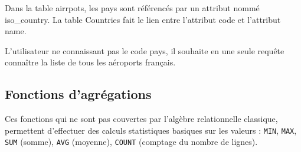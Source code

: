 \documentclass[10pt]{article}
\newif\ifprofvar
\begin{document}
\begin{exemple}
Dans la table airrpots, les pays sont référencés par un attribut nommé iso\_country. La table Countries fait le lien entre l'attribut code et l'attribut name. 

L'utilisateur ne connaissant pas le code pays, il souhaite en une seule requête connaître la liste de tous les aéroports français. 
\ifprofvar
$$
\pi_{\text{name}}\left( 
\pi_{\text{name,code}}\left(\text{Countries}  \right)
\underset{\text{airports.iso\_country}=\text{Countries.code}}{\bowtie }
\pi_{\text{name,iso\_country}}\left( \text{airports}  \right)
\right)
$$

\begin{envsql}
\begin{sql}
SELECT name FROM 
    (SELECT name, iso_country FROM airports) AS aeroports
    INNER JOIN 
    (SELECT Countries.code from Countries WHERE name="France") AS pays     
        ON aeroports.iso_country=pays.code
\end{sql}
\end{envsql}
\else
\vspace{6cm}
\fi


\end{exemple}

\subsection{Fonctions d'agrégations}
\begin{defi}
Ces fonctions qui ne sont pas couvertes par l’algèbre relationnelle 
classique, permettent d’effectuer des calculs statistiques basiques sur les valeurs : \texttt{MIN}, \texttt{MAX}, \texttt{SUM} 
(somme), \texttt{AVG} (moyenne), \texttt{COUNT} (comptage du nombre de lignes). 

\end{defi}
\end{document}
